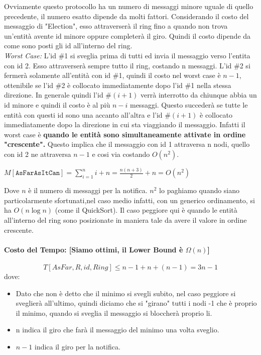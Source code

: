 Ovviamente questo protocollo ha un numero di messaggi minore uguale di quello
precedente, il numero esatto dipende da molti fattori. Considerando il costo del
messaggio di "Election", esso attraverserà il ring fino a quando non trova
un'entità avente id minore oppure completerà il giro. Quindi il costo dipende da
come sono posti gli id all'interno del ring.\\
\textit{Worst Case:} L'id \#1 si sveglia prima di tutti ed invia il messaggio
verso l'entita con id 2. Esso attraverserà sempre tutto il ring, costando n
messaggi. L'id \#2 si fermerà solamente all'entità con id \#1, quindi il costo
nel worst case è $n-1$, ottenibile se l'id \#2 è collocato immediatamente dopo
l'id \#1 nella stessa direzione. In generale quindi l'id \#$(i+1)$ verrà
interrotto da chiunque abbia un id minore e quindi il costo è al più $n-i$
messaggi. Questo succederà se tutte le entità con questi id sono una accanto
all'altra e l'id \#$(i+1)$ è collocato immediatamente dopo la direzione in cui sta
viaggiando il messaggio. Infatti il worst case è \textbf{quando le entità sono
    simultaneamente attivate in ordine "crescente".} Questo implica che il messaggio
con id 1 attraversa n nodi, quello con id 2 ne attraversa $n-1$ e cosi via
costando $O(n^2)$.
\begin{center}
    $M[\texttt{AsFarAsItCan}] = \sum_{i=1}^{n} i + n = \frac{n(n+3)}{2} + n = O(n^2)$
\end{center}
Dove $n$ è il numero di messaggi per la notifica. $n^2$ lo paghiamo quando siano
particolarmente sfortunati,nel caso medio infatti, con un generico ordinamento,
si ha $O(n \log n)$ (come il QuickSort). Il caso peggiore qui è quando le entità
all'interno del ring sono posizionate in maniera tale da avere il valore in
ordine crescente.

\paragraph{Costo del Tempo: [Siamo ottimi, il Lower Bound è $\Omega(n)$]}
$$T[AsFar,R,id,Ring] \leq n-1 + n + (n-1) = 3n - 1$$ dove:
\begin{itemize}
    \item Dato che non è detto che il minimo si svegli subito, nel caso peggiore
          si sveglierà all'ultimo, quindi diciamo che si "girano" tutti i nodi -1 che è
          proprio il minimo, quando si sveglia il messaggio si bloccherà proprio li.
    \item n indica il giro che farà il messaggio del minimo una volta sveglio.
    \item $n - 1$ indica il giro per la notifica.
\end{itemize}

